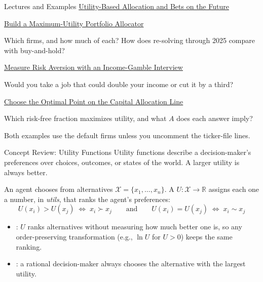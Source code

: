 \documentclass[aspectratio=169,11pt]{beamer}
\newcommand{\repo}{https://github.com/varnerlab/CHEME-5660-CourseRepository-Fall-2026/blob/main/lectures/week-8/L8b}
\begin{document}
\begin{frame}{Lectures and Examples}
\textbf{}
\href{\repo/CHEME-5660-L8b-Lecture-Utility-Allocation-Bets-Fall-2026.ipynb}{Utility-Based Allocation and Bets on the Future}

\vspace{0.6em}
\textbf{}
\href{\repo/CHEME-5660-L8b-Example-Utility-Allocator-Fall-2026.ipynb}{Build a Maximum-Utility Portfolio Allocator}

Which firms, and how much of each? How does re-solving through 2025 compare with buy-and-hold?

\vspace{0.6em}
\textbf{}
\href{\repo/interview/interview.md}{Measure Risk Aversion with an Income-Gamble Interview}

Would you take a job that could double your income or cut it by a third?

\vspace{0.6em}
\textbf{}
\href{\repo/CHEME-5660-L8b-Example-CAL-Optimal-Allocation-Fall-2026.ipynb}{Choose the Optimal Point on the Capital Allocation Line}

Which risk-free fraction maximizes utility, and what $A$ does each answer imply?

\vspace{0.6em}
Both examples use the default firms unless you uncomment the ticker-file lines.
\end{frame}

\begin{frame}{Concept Review: Utility Functions}
  Utility functions describe a decision-maker's preferences over choices, outcomes,
  or states of the world. A larger utility is always better.

  \vspace{0.5em}
  An agent chooses from alternatives $\mathcal{X}=\{x_1,\dots,x_n\}$. A
   $U:\mathcal{X}\rightarrow\mathbb{R}$ assigns each one a
  number, in \emph{utils}, that ranks the agent's preferences:
  \[
    \boxed{U(x_i)>U(x_j)\;\Longleftrightarrow\;x_i\succ x_j
      \qquad\text{and}\qquad
      U(x_i)=U(x_j)\;\Longleftrightarrow\;x_i\sim x_j}
  \]
  \begin{itemize}\setlength{\itemsep}{0.4em}
    \item {}: $U$ ranks alternatives without measuring how much
      better one is, so any order-preserving transformation (e.g., $\ln U$ for
      $U>0$) keeps the same ranking.
    \item {}: a rational decision-maker always chooses the
      alternative with the largest utility.
  \end{itemize}
\end{frame}
\end{document}
